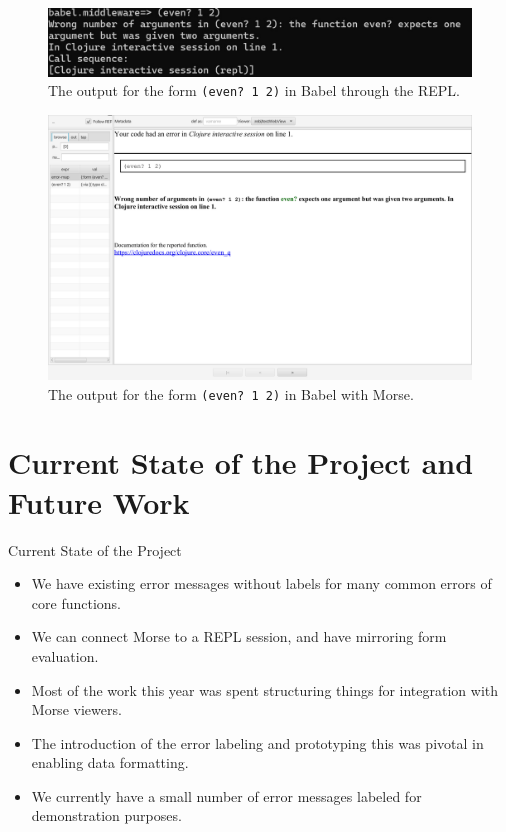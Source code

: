 \documentclass{beamer}
\begin{document}
\begin{frame}
  \begin{figure}
    \centering
    \includegraphics[width=\textwidth, height=0.25\textheight]{../resources/BabelREPL.jpg}
    \caption{The output for the form \texttt{(even?~1~2)} in Babel through the REPL. }
    \label{fig:BabelREPL}
  \end{figure}
\end{frame}

\begin{frame}
  \begin{figure}
    \centering
    \includegraphics[width=\textwidth]{../resources/BabelViewerExample.png}
    \caption{The output for the form \texttt{(even? 1 2)} in Babel with Morse.}
    \label{fig:defaultclj}
  \end{figure}
\end{frame}

\section{Current State of the Project and Future Work}
\begin{frame}{Current State of the Project}
  \begin{itemize}
    \item<1-> We have existing error messages without labels for many common errors of core functions.
    \item<2-> We can connect Morse to a REPL session, and have mirroring form evaluation.
    \item<3-> Most of the work this year was spent structuring things for integration with Morse viewers.
    \item<4-> The introduction of the error labeling and prototyping this was pivotal in enabling data formatting.
    \item<5-> We currently have a small number of error messages labeled for demonstration purposes.
  \end{itemize}
\end{frame}
\end{document}
